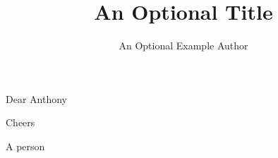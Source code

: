 \documentclass{dragonfly-letter}
\title{An Optional Title}
\author{An Optional Example Author}
\begin{document}
\maketitle

Dear Anthony

\lipsum[1-7]

Cheers

A person
\end{document}
